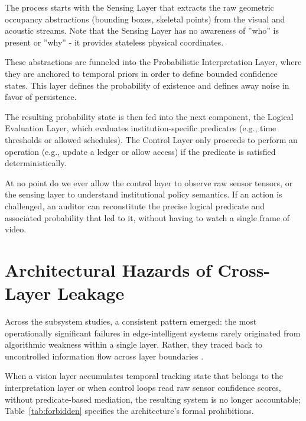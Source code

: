 \documentclass[conference]{IEEEtran}
\begin{document}
The process starts with the Sensing Layer that extracts the raw geometric occupancy abstractions (bounding boxes, skeletal points) from the visual and acoustic streams. Note that the Sensing Layer has no awareness of ''who'' is present or ''why'' - it provides stateless physical coordinates.

These abstractions are funneled into the Probabilistic Interpretation Layer, where they are anchored to temporal priors in order to define bounded confidence states. This layer defines the probability of existence and defines away noise in favor of persistence.

The resulting probability state is then fed into the next component, the Logical Evaluation Layer, which evaluates institution-specific predicates (e.g., time thresholds or allowed schedules). The Control Layer only proceeds to perform an operation (e.g., update a ledger or allow access) if the predicate is satisfied deterministically.

At no point do we ever allow the control layer to observe raw sensor tensors, or the sensing layer to understand institutional policy semantics. If an action is challenged, an auditor can reconstitute the precise logical predicate and associated probability that led to it, without having to watch a single frame of video.

\section{Architectural Hazards of Cross-Layer Leakage}

Across the subsystem studies, a consistent pattern emerged: the most operationally significant failures in edge-intelligent systems rarely originated from algorithmic weakness within a single layer. Rather, they traced back to uncontrolled information flow across layer boundaries \cite{b10}.

When a vision layer accumulates temporal tracking state that belongs to the interpretation layer or when control loops read raw sensor confidence scores, without predicate-based mediation, the resulting system is no longer accountable; Table~\ref{tab:forbidden} specifies the architecture’s formal prohibitions.
\end{document}
